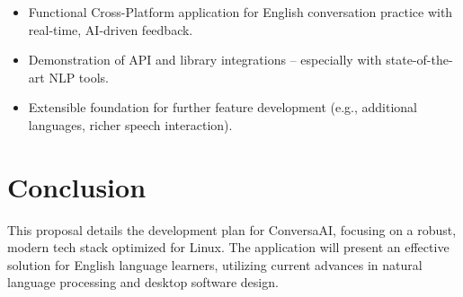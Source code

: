 \documentclass[12pt]{article}
\begin{document}
\begin{itemize}
    \item Functional Cross-Platform application for English conversation practice with real-time, AI-driven feedback.
    \item Demonstration of API and library integrations -- especially with state-of-the-art NLP tools.
    \item Extensible foundation for further feature development (e.g., additional languages, richer speech interaction).
\end{itemize}

\section*{Conclusion}

This proposal details the development plan for ConversaAI, focusing on a robust, modern tech stack optimized for Linux. The application will present an effective solution for English language learners, utilizing current advances in natural language processing and desktop software design.
\end{document}
